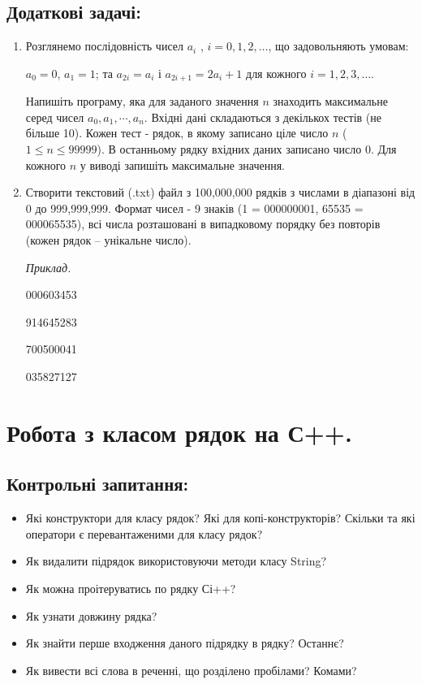 \documentclass[a5paper,titlepage,openany,twoside,draft]{book_unv}%
\begin{document}
\section{Додаткові задачі:}
\begin{enumerate}
\def\labelenumi{\arabic{enumi})}
\setcounter{enumi}{33}

\item  Розглянемо послідовність чисел \(a_{i}\) , $i = 0, 1, 2, \ldots$, що
задовольняють умовам:

\(a_{0} = 0\), \(a_{1} = 1\); та \(a_{2i} = a_{i}\) і
\(a_{2i + 1} = {2a}_{i} + 1\) для кожного $i = 1, 2, 3, \ldots{} $.

Напишіть програму, яка для заданого значення $n$ знаходить максимальне
серед чисел \(a_{0},a_{1},\cdots,a_{n}\). Вхідні дані складаються з
декількох тестів (не більше 10). Кожен тест - рядок, в якому записано
ціле число $n$ ($1 \le n \le 99 999$). В останньому рядку вхідних даних записано
число 0. Для кожного $n$ у виводі запишіть максимальне значення.

\item
Створити текстовий (.txt) файл з 100,000,000 рядків з числами
в діапазоні від 0 до 999,999,999. Формат чисел - 9 знаків 
(1 = 000000001, 65535 = 000065535), всі числа розташовані в випадковому порядку без
повторів (кожен рядок -- унікальне число).

\emph{Приклад.}

000603453
 
914645283 

700500041 

035827127 
\end{enumerate}


\chapter{Робота з класом рядок на С++.}
%

\section{Контрольні запитання:}
\begin{itemize}
\item
  Які конструктори для класу рядок? Які для копі-конструкторів? Скільки та
  які оператори є перевантаженими для класу рядок?
\item
  Як видалити підрядок використовуючи методи класу String?
\item
  Як можна проітеруватись по рядку Сі++?
\item
  Як узнати довжину рядка?
\item
  Як знайти перше входження даного підрядку в рядку? Останнє?
\item
  Як вивести всі слова в реченні, що розділено пробілами? Комами?
\end{itemize}
\end{document}
